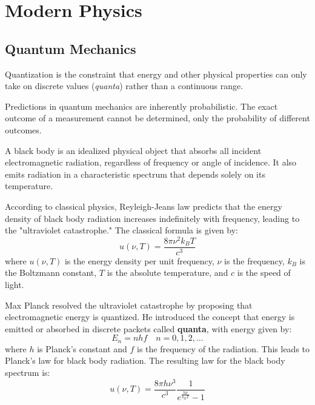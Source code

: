 \documentclass[11pt]{report}
\begin{document}
\chapter{Modern Physics}
\section{Quantum Mechanics}
\begin{definition}[Quantization]
    Quantization is the constraint that energy and other physical properties can only take on discrete values (\textit{quanta}) rather than a continuous range.
\end{definition}
\begin{definition}
    Predictions in quantum mechanics are inherently probabilistic. The exact outcome of a measurement cannot be determined, only the probability of different outcomes.
\end{definition}


\begin{definition}
    A black body is an idealized physical object that absorbs all incident electromagnetic radiation, regardless of frequency or angle of incidence. It also emits radiation in a characteristic spectrum that depends solely on its temperature.
\end{definition}
\begin{definition}
    According to classical physics, Reyleigh-Jeans law predicts that the energy density of black body radiation increases indefinitely with frequency, leading to the "ultraviolet catastrophe." The classical formula is given by:
    $$    u(\nu, T) = \frac{8\pi \nu^2 k_B T}{c^3} $$
    where \( u(\nu, T) \) is the energy density per unit frequency, \( \nu \) is the frequency, \( k_B \) is the Boltzmann constant, \( T \) is the absolute temperature, and \( c \) is the speed of light.
\end{definition}
\begin{definition}
    Max Planck resolved the ultraviolet catastrophe by proposing that electromagnetic energy is quantized. He introduced the concept that energy is emitted or absorbed in discrete packets called \textbf{quanta}, with energy given by:
    \begin{equation}
        E_n = n h f \quad n = 0, 1, 2, \ldots
    \end{equation}
    where \( h \) is Planck's constant and \( f \) is the frequency of the radiation. This leads to Planck's law for black body radiation. The resulting law for the black body spectrum is:
    \begin{equation}
        u(\nu, T) = \frac{8\pi h \nu^3}{c^3} \frac{1}{e^{\frac{h\nu}{k_B T}} - 1}
    \end{equation}
\end{definition}
\end{document}
